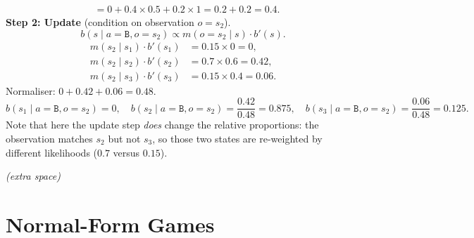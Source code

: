 \begin{enumerate}
\begin{solution}
\begin{align*}
           &= 0 + 0.4\times 0.5 + 0.2\times 1 = 0.2 + 0.2 = 0.4.
\end{align*}
\medskip
\noindent\textbf{Step 2: Update} (condition on observation $o = s_2$).
\[
  b(s \mid a=\texttt{B}, o=s_2) \propto m(o=s_2 \mid s)\cdot b'(s).
\]
\begin{align*}
  m(s_2 \mid s_1)\cdot b'(s_1) &= 0.15 \times 0 = 0, \\
  m(s_2 \mid s_2)\cdot b'(s_2) &= 0.7 \times 0.6 = 0.42, \\
  m(s_2 \mid s_3)\cdot b'(s_3) &= 0.15 \times 0.4 = 0.06.
\end{align*}
Normaliser: $0 + 0.42 + 0.06 = 0.48$.
\[
  b(s_1 \mid a=\texttt{B}, o=s_2) = 0,\quad
  b(s_2 \mid a=\texttt{B}, o=s_2) = \frac{0.42}{0.48} = 0.875,\quad
  b(s_3 \mid a=\texttt{B}, o=s_2) = \frac{0.06}{0.48} = 0.125.
\]
Note that here the update step \emph{does} change the relative proportions: the observation
matches $s_2$ but not $s_3$, so those two states are re-weighted by different likelihoods
($0.7$ versus $0.15$).
\end{solution}
\vspace{120pt}
\end{enumerate}
\clearpage
\begin{center}
    \textit{(extra space)}
\end{center}
\clearpage
\section{\points[20] Normal-Form Games}
